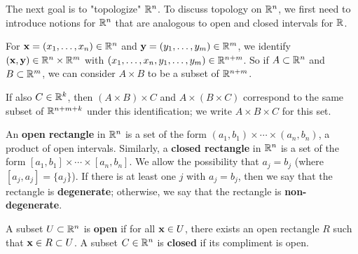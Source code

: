 \documentclass[../main.tex]{subfiles}
\begin{document}
The next goal is to "topologize" $\mathbb{R}^n$. To discuss topology on $\mathbb{R}^n$, we first need to introduce notions for $\mathbb{R}^n$ that are analogous to open and closed intervals for $\mathbb{R}$.

\begin{remark}\label{rmk:18.12}
    For $\mathbf{x}=(x_1,\dots,x_n)\in\mathbb{R}^n$ and $\mathbf{y}=(y_1,\dots,y_m)\in\mathbb{R}^m$, we identify $(\mathbf{x},\mathbf{y})\in\mathbb{R}^n\times\mathbb{R}^m$ with $(x_1,\dots,x_n,y_1,\dots,y_m)\in\mathbb{R}^{n+m}$. So if $A\subset\mathbb{R}^n$ and $B\subset\mathbb{R}^m$, we can consider $A\times B$ to be a subset of $\mathbb{R}^{n+m}$.\par
    If also $C\in\mathbb{R}^k$, then $(A\times B)\times C$ and $A\times(B\times C)$ correspond to the same subset of $\mathbb{R}^{n+m+k}$ under this identification; we write $A\times B\times C$ for this set.
\end{remark}

\begin{definition}\label{dfn:18.13}
    An \textbf{open rectangle} in $\mathbb{R}^n$ is a set of the form $(a_1,b_1)\times\cdots\times(a_n,b_n)$, a product of open intervals. Similarly, a \textbf{closed rectangle} in $\mathbb{R}^n$ is a set of the form $[a_1,b_1]\times\cdots\times[a_n,b_n]$. We allow the possibility that $a_j=b_j$ (where $[a_j,a_j]=\{a_j\}$). If there is at least one $j$ with $a_j=b_j$, then we say that the rectangle is \textbf{degenerate}; otherwise, we say that the rectangle is \textbf{non-degenerate}.
\end{definition}

\begin{definition}\label{dfn:18.14}
    A subset $U\subset\mathbb{R}^n$ is \textbf{open} if for all $\mathbf{x}\in U$, there exists an open rectangle $R$ such that $\mathbf{x}\in R\subset U$. A subset $C\in\mathbb{R}^n$ is \textbf{closed} if its compliment is open.
\end{definition}
\end{document}
